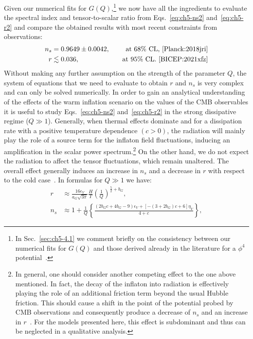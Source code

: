 Given our numerical fits for $G(Q)$,\footnote{In Sec.~\ref{sec:ch5-4.1} we comment briefly on the consistency between our numerical fits for $G(Q)$ and those derived already in the literature for a $\phi^4$ potential~\cite{Bastero-Gil:2016qru, Benetti:2016jhf}.} we now have all the ingredients to evaluate the spectral index and tensor-to-scalar ratio from Eqs.~\ref{eq:ch5-ns2} and~\ref{eq:ch5-r2} and compare the obtained results with most recent constraints from observations:
\begin{align}
    n_s & = 0.9649\pm 0.0042,& \quad \text{at 68\% CL,~\cite{Planck:2018jri}} \label{eq:ch5-ns_Planck} \\
    r &\lesssim 0.036, & \quad \text{at 95\% CL.~\cite{BICEP:2021xfz}} \label{eq:ch5-r_Planck}
\end{align}
Without making any further assumption on the strength of the parameter $Q$, the system of equations that we need to evaluate to obtain $r$ and $n_s$ is very complex and can only be solved numerically. In order to gain an analytical understanding of the effects of the warm inflation scenario on the values of the CMB observables it is useful to study Eqs.~\ref{eq:ch5-ns2} and~\ref{eq:ch5-r2} in the strong dissipative regime ($Q \gg 1$). Generally, when thermal effects dominate and for a dissipation rate with a positive temperature dependence $(c>0)$, the radiation will mainly play the role of a source term for the inflaton field fluctuations, inducing an amplification in
the scalar power spectrum.\footnote{In general, one should consider another competing effect to the one above mentioned. In fact, the decay of the inflaton into radiation is effectively playing the role of an additional friction term beyond the usual Hubble friction. This should cause a shift in the point of the potential probed by CMB observations and consequently produce a decrease of $n_s$ and an increase in $r$~\cite{Berera:2018tfc}. For the models presented here, this effect is subdominant and thus can be neglected in a qualitative analysis.} On the other hand, we do not expect  the radiation to affect the tensor fluctuations, which remain unaltered. The overall effect generally induces an increase in $n_s$ and a decrease in $r$ with respect to the cold case~\cite{Berera:2018tfc}. In formulas for $Q \gg 1$ we have:
\begin{align}
    r&\approx \frac{16 \epsilon_V}{a_G\sqrt{3\pi}}\frac{H}{T}\left(\frac{1}{Q}\right)^{\frac{5}{2}+b_G},\label{eq:ch5-r_SR} \\
    n_s&\approx1+\frac{1}{Q}\left\{\frac{(2b_G c+4b_G-9)\epsilon_V+[-(3+2b_G)c+6]\eta_V}{4+c}\right\}, \label{eq:ch5-ns_SR}
\end{align}
